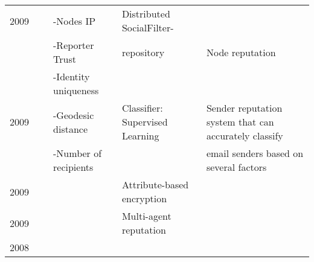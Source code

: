 \begin{longtable}{lllll}
	2009  & \cite{yang_socialfilter_2009}                  & -Nodes IP                        & Distributed SocialFilter-        &                                                               \\
	\     & \                                              & -Reporter Trust                  & repository                       & Node reputation                                               \\
	\     & \                                              & -Identity uniqueness             &                                  &                                                               \\\hline
	2009  & \cite{hao_detecting_2009}                      & -Geodesic distance               & Classifier: Supervised Learning  & Sender reputation system that can accurately classify         \\
	\     &                                                & -Number of recipients            &                                  & email senders based on several factors                        \\\hline
	2009  & \cite{baden_persona_2009}                      &                                  & Attribute-based encryption       &                                                               \\\hline
	2009  & \cite{paradesi_integrating_2009}               &                                  & Multi-agent reputation           &                                                               \\\hline
	2008  & \cite{mislove_ostra_2008}                      &                                  &                                  &                                                               \\\hline

\end{longtable}
